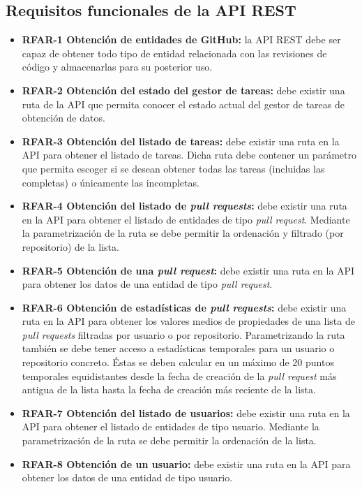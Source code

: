 \subsection{Requisitos funcionales de la API REST}

\begin{itemize}
	\item \textbf{RFAR-1 Obtención de entidades de GitHub:} la API REST debe ser capaz de obtener todo tipo de entidad relacionada con las revisiones de código y almacenarlas para su posterior uso.
	\item \textbf{RFAR-2 Obtención del estado del gestor de tareas:} debe existir una ruta de la API que permita conocer el estado actual del gestor de tareas de obtención de datos.
	\item \textbf{RFAR-3 Obtención del listado de tareas:} debe existir una ruta en la API para obtener el listado de tareas. Dicha ruta debe contener un parámetro que permita escoger si se desean obtener todas las tareas (incluidas las completas) o únicamente las incompletas.
	\item \textbf{RFAR-4 Obtención del listado de \textit{pull requests}:} debe existir una ruta en la API para obtener el listado de entidades de tipo \textit{pull request}. Mediante la parametrización de la ruta se debe permitir la ordenación y filtrado (por repositorio) de la lista.
	\item \textbf{RFAR-5 Obtención de una \textit{pull request}:} debe existir una ruta en la API para obtener los datos de una entidad de tipo \textit{pull request}.
	\item \textbf{RFAR-6 Obtención de estadísticas de \textit{pull requests}:} debe existir una ruta en la API para obtener los valores medios de propiedades de una lista de \textit{pull requests} filtradas por usuario o por repositorio. Parametrizando la ruta también se debe tener acceso a estadísticas temporales para un usuario o repositorio concreto. Éstas se deben calcular en un máximo de 20 puntos temporales equidistantes desde la fecha de creación de la \textit{pull request} más antigua de la lista hasta la fecha de creación más reciente de la lista.
	\item \textbf{RFAR-7 Obtención del listado de usuarios:} debe existir una ruta en la API para obtener el listado de entidades de tipo usuario. Mediante la parametrización de la ruta se debe permitir la ordenación de la lista.
	\item \textbf{RFAR-8 Obtención de un usuario:} debe existir una ruta en la API para obtener los datos de una entidad de tipo usuario.

\end{itemize}
